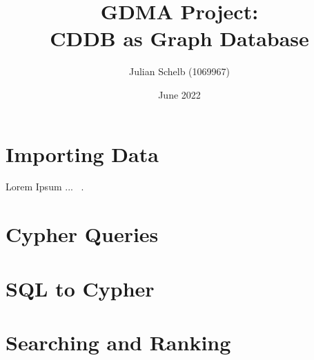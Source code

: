 \documentclass{article}
\title{GDMA Project: \\ CDDB as Graph Database}
\author{Julian Schelb (1069967)}
\date{June 2022}
\begin{document}
\maketitle

\section{Importing Data}

Lorem Ipsum ... ~\cite{Nobody06}.

\section{Cypher Queries}

\section{SQL to Cypher}

\section{Searching and Ranking}

{}

\end{document}
